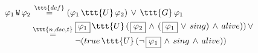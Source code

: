 \documentclass[11pt]{article}
\begin{document}
    $\begin{aligned}
         \varphi_1\,\tt{W}\,\varphi_2 &\,\overset{\ttt{def}}{=} (\varphi_1\,\ttt{U}\,\varphi_2)\,\lor\,\ttt{G}\,\varphi_1 \\
         &\overset{\ttt{n,dsc,t}}{=} \begin{aligned}
                                         &\boxed{\varphi_1}\,\ttt{U}\,(\,\boxed{\varphi_2}\,\land\,(\,\boxed{\varphi_1}\,\lor\,sing)\,\land\,alive))\,\lor\\
                                         &\neg (true\,\ttt{U}\,(\neg\,\boxed{\varphi_1}\,\land\,sing\,\land\,alive))
         \end{aligned}
    \end{aligned}$
\end{document}
